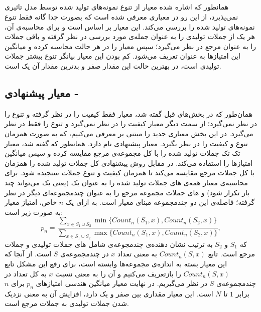 \subsection{}\label{Metric:SelfBLEU}
همانطور که اشاره شده معیار
از تنوع نمونه‌های تولید شده توسط مدل تاثیری نمی‌پذیرد، از این رو در
\cite{zhu2018texygen}
معیاری معرفی شده است که بصورت جدا گانه فقط تنوع نمونه‌های تولید شده را بررسی می‌کند.
\newline
این معیار بر اساس 
است و برای محاسبه‌ی آن، هر یک از جملات تولیدی را به عنوان جمله‌ی مورد بررسی در نظر گرفته و باقی‌ جملات را به عنوان مرجع در نظر می‌گیرد؛ سپس معیار
را در هر حالت محاسبه کرده و میانگین این امتیاز‌ها به عنوان 
تعریف می‌شود. کم بودن این معیار بیانگر تنوع بیشتر جملات تولیدی است، در بهترین حالت این مقدار صفر و بدترین مقدار آن یک است.

\subsection{معیار پیشنهادی -  }\label{Metric:MSJaccard}
همان‌طور که در بخش‌های قبل گفته شد، معیار
فقط کیفیت را در نظر گرفته و تنوع را در نظر نمی‌گیرد؛ از سمت دیگر معیار
کیفیت را در نظر نمی‌گیرد و تنوع را فقط در نظر می‌گیرد. در این بخش معیاری جدید را مبتنی بر
\ngram{}
معرفی می‌کنیم، که به صورت همزمان تنوع و کیفیت را در نظر بگیرد. معیار پیشنهادی
نام دارد.
\newline
همانطور که گفته شد، معیار
تک تک جملات تولید شده را  با کل مجموعه‌ی مرجع مقایسه کرده و سپس میانگین‌ امتیاز‌ها را استفاده می‌کند. در مقابل روش پیشنهادی کل جملات تولید شده را همزمان با کل جملات مرجع مقایسه می‌کند تا همزمان کیفیت و تنوع جملات سنجیده شود. برای محاسبه‌ی معیار همه‌ی 
\ngram
های جملات تولید شده را به عنوان یک
(یعنی یک 
\ngram{}
 می‌تواند چند بار تکرار شود) و 
\ngram
های جملات مجموعه مرجع را به عنوان چند‌مجموعه‌ای دیگر در نظر گرفته؛ فاصله‌ی
این دو چندمجموعه مبنا‌ی معیار
است. به ازای یک $n$ خاص، امتیاز معیار به صورت زیر است:
\begin{equation}\label{Eq:metric:MSJ}
p_n = \frac
{\sum_{x \in S_1 \cup S_2} \min\{Count_n(S_1,x), Count_n(S_2,x)\} }
{\sum_{x \in S_1 \cup S_2} \max\{Count_n(S_1,x), Count_n(S_2,x)\} },
\end{equation}
که $S_1$ و $S_2$ به ترتیب نشان دهنده‌ی چندمجوعه‌ی شامل 
\ngram
های جملات تولیدی و جملات مرجع است. تابع 
$Count_n(S,x)$
به معنی تعداد
\ngram{}
$x$
در چندمجموعه‌ی $S$ است.
\newline
از آنجا که این معیار بسته به اندازه‌ی مجموعه‌ها وابسته است، برای رفع این مشکل تابع
$Count_n(S,x)$
را بازتعریف می‌کنیم و آن را به معنی نسبت
\ngram{}
$x$
به کل تعداد در چندمجموعه‌ی $S$ در نظر می‌گیریم. در نهایت معیار
میانگین هندسی امتیازهای $p_n$ برای $n$ برابر $1$ تا $N$ است.
\newline
این معیار مقداری بین صفر و یک دارد، افزایش آن به معنی نزدیک شدن جملات تولیدی به جملات مرجع است.


